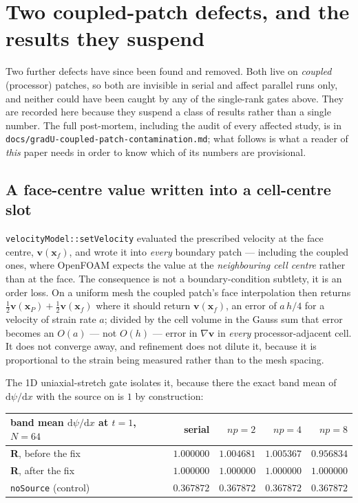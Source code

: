 \documentclass[preprint,3p,11pt]{elsarticle}
\newcommand{\psilev}{\psi}
\begin{document}
\section{Two coupled-patch defects, and the results they suspend}
\label{sec:coupledpatch}

Two further defects have since been found and removed. Both live on
\emph{coupled} (processor) patches, so both are invisible in serial and affect
parallel runs only, and neither could have been caught by any of the single-rank
gates above. They are recorded here because they suspend a class of results rather
than a single number. The full post-mortem, including the audit of every affected
study, is in \texttt{docs/gradU-coupled-patch-contamination.md}; what follows is
what a reader of \emph{this} paper needs in order to know which of its numbers are
provisional.

\subsection{A face-centre value written into a cell-centre slot}
\label{sec:gradUdefect}

\texttt{velocityModel::setVelocity} evaluated the prescribed velocity at the face
centre, $\mathbf{v}(\mathbf{x}_f)$, and wrote it into \emph{every} boundary patch
--- including the coupled ones, where OpenFOAM expects the value at the
\emph{neighbouring cell centre} rather than at the face. The consequence is not a
boundary-condition subtlety, it is an order loss. On a uniform mesh the coupled
patch's face interpolation then returns
$\tfrac12\mathbf{v}(\mathbf{x}_P) + \tfrac12\mathbf{v}(\mathbf{x}_f)$ where it
should return $\mathbf{v}(\mathbf{x}_f)$, an error of $a\,h/4$ for a velocity of
strain rate $a$; divided by the cell volume in the Gauss sum that error becomes an
$O(a)$ --- not $O(h)$ --- error in $\nabla\mathbf{v}$ in \emph{every}
processor-adjacent cell. It does not converge away, and refinement does not dilute
it, because it is proportional to the strain being measured rather than to the
mesh spacing.

The 1D uniaxial-stretch gate isolates it, because there the exact band mean of
$\mathrm{d}\psilev/\mathrm{d}x$ with the source on is $1$ by construction:

\begin{center}
\begin{tabular}{lrrrr}
\toprule
band mean $\mathrm{d}\psilev/\mathrm{d}x$ at $t=1$, $N=64$ & serial & $np=2$ & $np=4$ & $np=8$ \\
\midrule
\textbf{R}, before the fix   & $1.000000$ & $1.004681$ & $1.005367$ & $0.956834$ \\
\textbf{R}, after the fix    & $1.000000$ & $1.000000$ & $1.000000$ & $1.000000$ \\
\texttt{noSource} (control)  & $0.367872$ & $0.367872$ & $0.367872$ & $0.367872$ \\
\bottomrule
\end{tabular}
\end{center}
\end{document}

